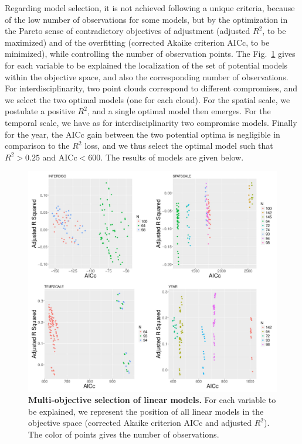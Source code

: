 \documentclass[10pt]{article}
\begin{document}
Regarding model selection, it is not achieved following a unique criteria, because of the low number of observations for some models, but by the optimization in the Pareto sense of contradictory objectives of adjustment (adjusted $R^2$, to be maximized) and of the overfitting (corrected Akaike criterion AICc, to be minimized), while controlling the number of observation points. The Fig.~\ref{fig:app:quantepistemo:regressions} gives for each variable to be explained the localization of the set of potential models within the objective space, and also the corresponding number of observations. For interdisciplinarity, two point clouds correspond to different compromises, and we select the two optimal models (one for each cloud). For the spatial scale, we postulate a positive $R^2$, and a single optimal model then emerges. For the temporal scale, we have as for interdisciplinarity two compromise models. Finally for the year, the AICc gain between the two potential optima is negligible in comparison to the $R^2$ loss, and we thus select the optimal model such that $R^2>0.25$ and AICc$<600$. The results of models are given below.


\begin{figure}
\includegraphics[width=\linewidth]{Fig3.jpg}
\caption{\textbf{Multi-objective selection of linear models.} For each variable to be explained, we represent the position of all linear models in the objective space (corrected Akaike criterion AICc and adjusted $R^2$). The color of points gives the number of observations.\label{fig:app:quantepistemo:regressions}}
\end{figure}
\end{document}
